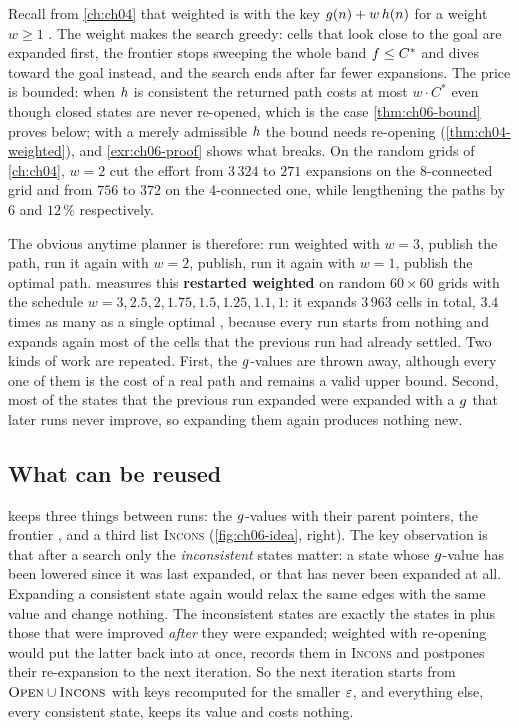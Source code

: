 Recall from \cref{ch:ch04} that weighted \astar{} is \astar
with the key $g(n) + w\,h(n)$ for a weight $w \ge 1$
\cite{pohl1970heuristic}. The weight makes the search greedy: cells that look
close to the goal are expanded first, the frontier stops sweeping the whole
band $f \le C^*$ and dives toward the goal instead, and the search ends
after far fewer expansions. The price is bounded: when $h$ is consistent
the returned path costs at most $w \cdot C^*$ even though closed states are
never re-opened, which is the case \cref{thm:ch06-bound} proves below; with a
merely admissible $h$ the bound needs re-opening
(\cref{thm:ch04-weighted}), and \cref{exr:ch06-proof} shows what breaks. On
the random grids of \cref{ch:ch04}, $w = 2$ cut the effort from $3\,324$ to
$271$ expansions on the 8-connected grid and from $756$ to $372$ on the
4-connected one, while lengthening the paths by $6$ and $12\,\%$
respectively.

The obvious anytime planner is therefore: run weighted \astar with $w = 3$,
publish the path, run it again with $w = 2$, publish, run it again with
$w = 1$, publish the optimal path.  measures this
\textbf{restarted weighted \astar} on random
$60 \times 60$ grids with the schedule $w = 3, 2.5, 2, 1.75, 1.5, 1.25, 1.1,
1$: it expands $3\,963$ cells in total, $3.4$ times as many as a single optimal
\astar, because every run starts from nothing and expands again most of the
cells that the previous run had already settled. Two kinds of work are
repeated. First, the $g$-values are thrown away, although every one of
them is the cost of a real path and remains a valid upper bound. Second, most
of the states that the previous run expanded were expanded with a $g$
that later runs never improve, so expanding them again produces nothing new.

\subsection{What can be reused}

\arastar keeps three things between runs: the $g$-values with their
parent pointers, the frontier \Open, and a third list \textsc{Incons}
(\cref{fig:ch06-idea}, right). The key observation is that after a search only
the \emph{inconsistent} states matter: a state whose $g$-value has been
lowered since it was last expanded, or that has never been expanded at all.
Expanding a consistent state again would relax the same edges with the same
value and change nothing. The inconsistent states are exactly the states in
\Open plus those that were improved \emph{after} they were expanded; weighted
\astar with re-opening would put the latter back into \Open at once, \arastar
records them in \textsc{Incons} and postpones their re-expansion to the next
iteration. So the next iteration starts from $\textsc{Open} \cup \textsc{Incons}$ with
keys recomputed for the smaller $\varepsilon$, and everything else, every consistent
state, keeps its value and costs nothing.

